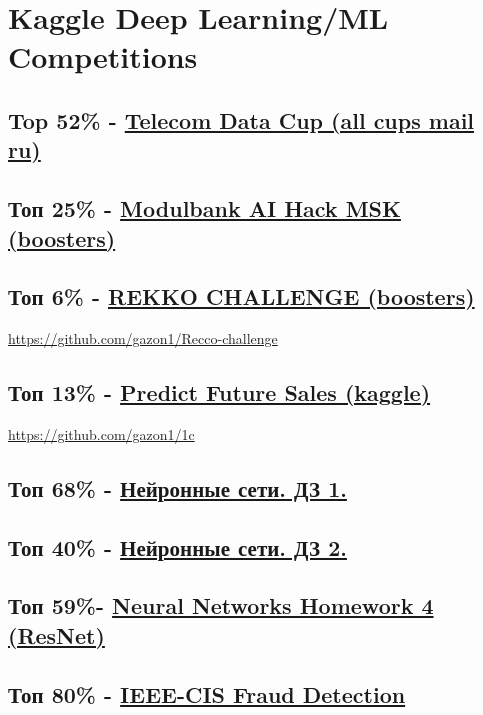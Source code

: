 \documentclass[11pt]{article}
\begin{document}
\section{Kaggle Deep Learning/ML Competitions}
\label{sec:orgc0bfc93}
\subsection{Top 52\% - \href{https://cups.mail.ru/results/41?period=past\&round\_id=430}{Telecom Data Cup (all cups mail ru)}}
\label{sec:org99c551c}
\subsection{Топ 25\% - \href{https://boosters.pro/championship/modulbank1}{Modulbank AI Hack MSK (boosters)}}
\label{sec:org13ef715}
\subsection{Топ 6\% - \href{https://boosters.pro/championship/rekko\_challenge/overview}{REKKO CHALLENGE (boosters)}}
\label{sec:org66b6fcc}
\url{https://github.com/gazon1/Recco-challenge}

\subsection{Топ 13\% - \href{https://www.kaggle.com/c/competitive-data-science-predict-future-sales}{Predict Future Sales (kaggle)}}
\label{sec:orgc4a7eb7}
\url{https://github.com/gazon1/1c}

\subsection{Топ 68\% - \href{https://www.kaggle.com/c/2019s-neuralnet-track}{Нейронные сети. ДЗ 1.}}
\label{sec:org1dc2ec2}
\subsection{Топ 40\% - \href{https://www.kaggle.com/c/nn-track-2019-spring-hw2}{Нейронные сети. ДЗ 2.}}
\label{sec:org8a02f0c}
\subsection{Топ 59\%- \href{https://www.kaggle.com/c/neuralnetworkshomework4/leaderboard}{Neural Networks Homework 4 (ResNet)}}
\label{sec:orgb8ece88}
\subsection{Топ 80\% - \href{https://www.kaggle.com/c/ieee-fraud-detection}{IEEE-CIS Fraud Detection}}
\label{sec:org63c2b67}
\end{document}
